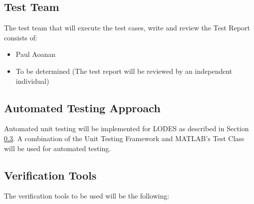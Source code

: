 \documentclass[12pt, titlepage]{article}
\newcommand{\famname}{LODES} %
\begin{document}
\subsection{Test Team}

The test team that will execute the test cases, write and review the Test Report consists of:
\begin{itemize}
 \item Paul Aoanan
 \item To be determined (The test report will be reviewed by an independent individual)
\end{itemize} 

\subsection{Automated Testing Approach}
Automated unit testing will be implemented for \famname{} as described in Section \ref{sec_verificationtools}.
A combination of the Unit Testing Framework and MATLAB's Test Class will be used for automated testing.


\subsection{Verification Tools} \label{sec_verificationtools}
The verification tools to be used will be the following:
\end{document}
